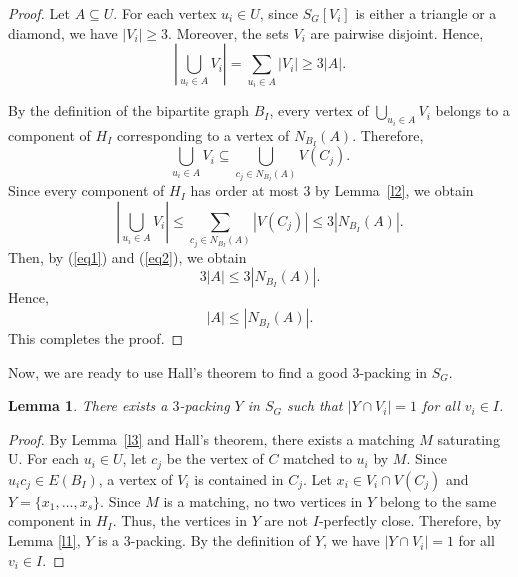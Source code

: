 \documentclass[12pt, oneside]{scrartcl}
\newtheorem{lemma}{Lemma}%
\begin{document}
\begin{proof}
Let $A\subseteq U$. For each vertex $u_i\in U$, since $S_G[V_i]$ is either a triangle or a diamond, we have
$|V_i|\geq 3.$ Moreover, the sets $V_i$ are pairwise disjoint. Hence, \begin{equation}\label{eq1}
    \left|\bigcup_{u_i\in A}V_i\right|=\sum_{u_i\in A}|V_i|\geq 3|A|.
\end{equation}

By the definition of the bipartite graph $B_I$, every vertex of $\bigcup_{u_i\in A}V_i$
belongs to a component of $H_I$ corresponding to a vertex of $N_{B_I}(A)$. Therefore, 
$$\bigcup_{u_i\in A}V_i \subseteq \bigcup_{c_j\in N_{B_I}(A)}V(C_j).$$
Since every component of $H_I$ has order at most $3$ by Lemma~\ref{l2}, we obtain
\begin{equation}\label{eq2}
    \left|\bigcup_{u_i\in A}V_i\right|\leq \sum_{c_j\in N_{B_I}(A)}|V(C_j)|\leq3|N_{B_I}(A)|.
\end{equation}
Then, by (\ref{eq1}) and (\ref{eq2}), we obtain
$$3|A|\leq 3|N_{B_I}(A)|.$$
Hence, 
$$|A|\leq |N_{B_I}(A)|.$$
This completes the proof.
\end{proof}

Now, we are ready to use Hall's theorem to find a good $3$-packing in $S_G$.
\begin{lemma}\label{l4}
    There exists a $3$-packing $Y$ in $S_G$ such that $|Y\cap V_i|=1$ for all $v_i\in I$.
\end{lemma}
\begin{proof}
    By Lemma~\ref{l3} and Hall's theorem, there exists a matching $M$ saturating U. For each $u_i\in U$, let $c_j$ be the vertex of $C$ matched to $u_i$ by $M$. Since $u_ic_j\in E(B_I)$, a vertex of  $V_i$ is contained in $C_j$. Let $x_i\in V_i\cap V(C_j)$ and $Y=\{x_1,\dots ,x_s\}$. Since $M$ is a matching, no two vertices in $Y$ belong to the same component in $H_I$. Thus, the vertices in $Y$ are not $I$-perfectly close. Therefore, by Lemma \ref{l1}, $Y$ is a $3$-packing. By the definition of $Y$, we have $|Y\cap V_i|=1$ for all $v_i\in I$.
\end{proof}
\end{document}
